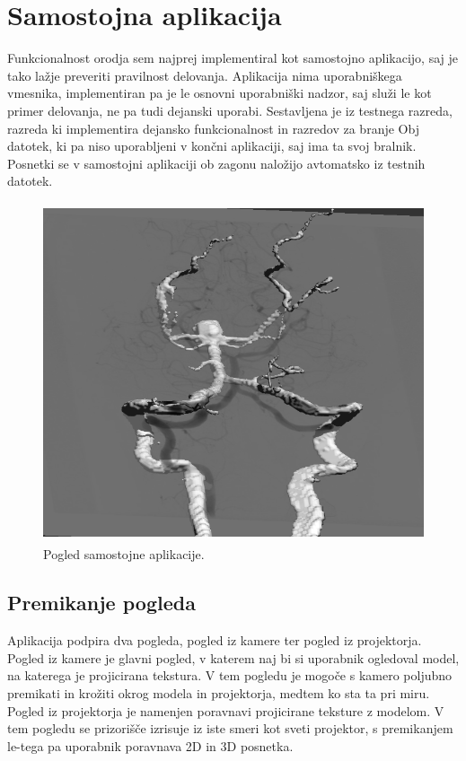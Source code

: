 \documentclass[a4paper, 12pt]{book}
\begin{document}
\section{Samostojna aplikacija}

Funkcionalnost orodja sem najprej implementiral kot samostojno aplikacijo, saj je tako lažje preveriti pravilnost delovanja. Aplikacija nima uporabniškega vmesnika, implementiran pa je le osnovni uporabniški nadzor, saj služi le kot primer delovanja, ne pa tudi dejanski uporabi. Sestavljena je iz testnega razreda, razreda ki implementira dejansko funkcionalnost in razredov za branje Obj datotek, ki pa niso uporabljeni v končni aplikaciji, saj ima ta svoj bralnik. Posnetki se v samostojni aplikaciji ob zagonu naložijo avtomatsko iz testnih datotek.

\begin{figure}[h]
\begin{center}
\includegraphics[width=12cm, height=10cm, keepaspectratio=true]{Samostojna_aplikacija.png}
\end{center}
\caption{Pogled samostojne aplikacije.}
\label{samostojnaaplikacija}
\end{figure}

\subsection*{Premikanje pogleda}

Aplikacija podpira dva pogleda, pogled iz kamere ter pogled iz projektorja. Pogled iz kamere je glavni pogled, v katerem naj bi si uporabnik ogledoval model, na katerega je projicirana tekstura. V tem pogledu je mogoče s kamero poljubno premikati in krožiti okrog modela in projektorja, medtem ko sta ta pri miru. Pogled iz projektorja je namenjen poravnavi projicirane teksture z modelom. V tem pogledu se prizorišče izrisuje iz iste smeri kot sveti projektor, s premikanjem le-tega pa uporabnik poravnava 2D in 3D posnetka.
\end{document}
